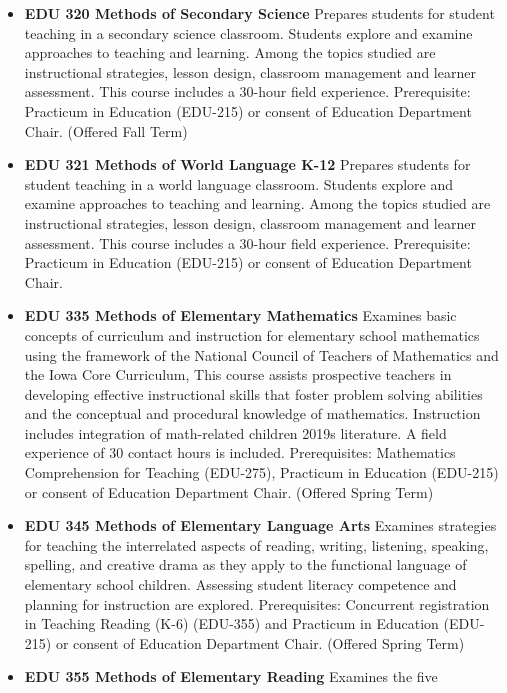 \documentclass[
  letterpaper,
]{scrbook}
\begin{document}
\begin{itemize}
\item
  \textbf{EDU 320 Methods of Secondary Science} Prepares students for
  student teaching in a secondary science classroom. Students explore
  and examine approaches to teaching and learning. Among the topics
  studied are instructional strategies, lesson design, classroom
  management and learner assessment. This course includes a 30-hour
  field experience. Prerequisite: Practicum in Education (EDU-215) or
  consent of Education Department Chair. (Offered Fall Term)\\
\item
  \textbf{EDU 321 Methods of World Language K-12} Prepares students for
  student teaching in a world language classroom. Students explore and
  examine approaches to teaching and learning. Among the topics studied
  are instructional strategies, lesson design, classroom management and
  learner assessment. This course includes a 30-hour field experience.
  Prerequisite: Practicum in Education (EDU-215) or consent of Education
  Department Chair.\\
\item
  \textbf{EDU 335 Methods of Elementary Mathematics} Examines basic
  concepts of curriculum and instruction for elementary school
  mathematics using the framework of the National Council of Teachers of
  Mathematics and the Iowa Core Curriculum, This course assists
  prospective teachers in developing effective instructional skills that
  foster problem solving abilities and the conceptual and procedural
  knowledge of mathematics. Instruction includes integration of
  math-related children 2019s literature. A field experience of 30
  contact hours is included. Prerequisites: Mathematics Comprehension
  for Teaching (EDU-275), Practicum in Education (EDU-215) or consent of
  Education Department Chair. (Offered Spring Term)\\
\item
  \textbf{EDU 345 Methods of Elementary Language Arts} Examines
  strategies for teaching the interrelated aspects of reading, writing,
  listening, speaking, spelling, and creative drama as they apply to the
  functional language of elementary school children. Assessing student
  literacy competence and planning for instruction are explored.
  Prerequisites: Concurrent registration in Teaching Reading (K-6)
  (EDU-355) and Practicum in Education (EDU-215) or consent of Education
  Department Chair. (Offered Spring Term)\\
\item
  \textbf{EDU 355 Methods of Elementary Reading} Examines the five

\end{itemize}
\end{document}
